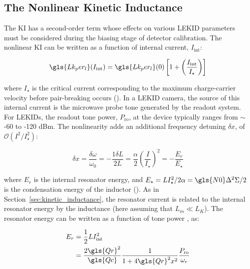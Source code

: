\subsection{The Nonlinear Kinetic Inductance}\label{nonlinearKI}

The KI has a second-order term whose effects on various LEKID parameters must be considered during the biasing stage of detector calibration. The nonlinear KI can be written as a function of internal current, $I_{\mathrm{int}}$:

\begin{equation} \label{eq:nonlinear KI}
  \gls{Lk_per_l}(I_{\mathrm{int}}) = \gls{Lk_per_l}(0) \left[ 1 + \left( \frac{I_{\mathrm{int}}}{I_{\star}} \right) \right]
\end{equation}

where $I_{\star}$ is the critical current corresponding to the maximum charge-carrier velocity before pair-breaking occurs (\citet{tinkham2004introduction,anlage1989current,annunziata2010tunable}). In a LEKID camera, the source of this internal current is the microwave probe tone generated by the readout system. For LEKIDs, the readout tone power, $P_{\mathrm{ro}}$, at the device typically ranges from $\sim$-60 to -120 dBm.
The nonlinearity adds an additional frequency detuning $\delta x$, of $\mathcal{O}(I^{2}/I_{\star}^{2})$:

\begin{equation}
  \delta x = \frac{\delta \omega}{\omega_{0}} = -\frac{1\delta L}{2L} = \frac{\alpha}{2}\left( \frac{I}{I_{\star}} \right)^{2} = -\frac{E_{r}}{E_{\star}}
\end{equation}

where $E_{r}$ is the internal resonator energy, and $E_{\star} = LI_{\star}^{2}/2\alpha = \gls{N0} \Delta^{2} \Sigma/2$ is the condensation energy of the inductor (\citet{mauskopf2018transition,tinkham2004introduction}). As in Section~\ref{sec:kinetic_inductance}, the resonator current is related to the internal resonator energy by the inductance (here assuming that $L_{m} \ll L_{K}$). The resonator energy can be written as a function of tone power \citep{swenson2013operation}, as:

\begin{equation}
 \begin{aligned}
  E_{r} &= \frac{1}{2}LI_{\mathrm{int}}^{2}\\
        &= \frac{2\gls{Qr}^{2}}{\gls{Qc}}\frac{1}{1 + 4\gls{Qr}^{2}x^{2}}\frac{P_{\mathrm{ro}}}{\omega_{r}}
  \end{aligned}
\end{equation}

